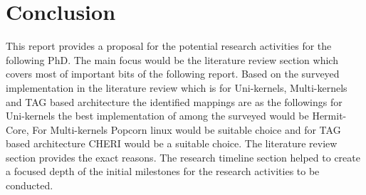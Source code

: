 
\chapter{Conclusion}  %
This report provides a proposal for the potential research 
activities for the following PhD. The main focus would be 
the literature review section which covers most of important 
bits of the following report. Based on the surveyed implementation 
in the literature review which is for Uni-kernels, Multi-kernels 
and TAG based architecture the identified mappings are as the followings 
for Uni-kernels the best implementation of among the surveyed would be Hermit-Core, For Multi-kernels 
Popcorn linux would be suitable choice and for TAG based architecture
CHERI would be a suitable choice. The literature review section
provides the exact reasons. The research timeline section helped
to create a focused depth of the initial milestones for the research 
activities to be conducted.